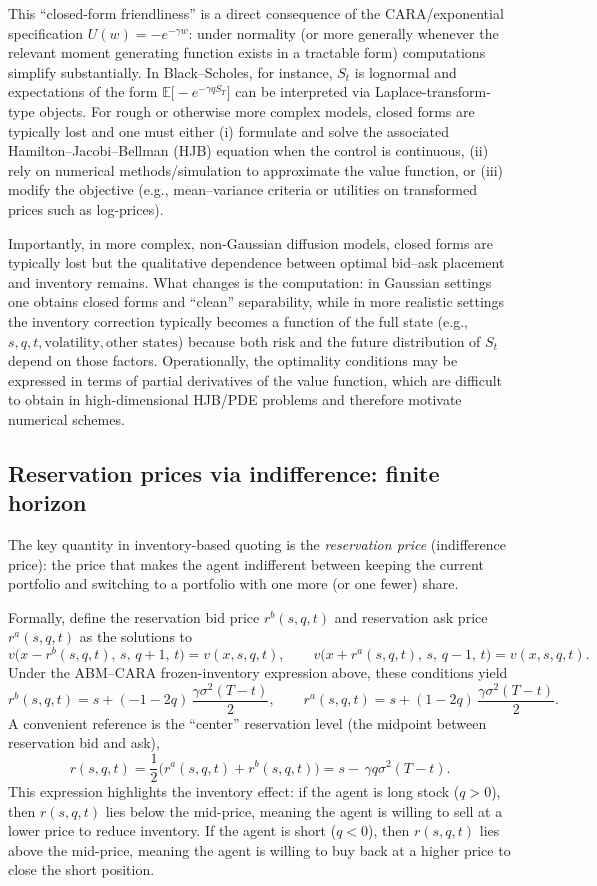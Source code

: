 This ``closed-form friendliness'' is a direct consequence of the CARA/exponential specification $U(w)=-e^{-\gamma w}$: under normality (or more generally whenever the relevant moment generating function exists in a tractable form) computations simplify substantially. In Black--Scholes, for instance, $S_t$ is lognormal and expectations of the form $\mathbb{E}\bigl[-e^{-\gamma q S_T}\bigr]$ can be interpreted via Laplace-transform-type objects. For rough or otherwise more complex models, closed forms are typically lost and one must either (i) formulate and solve the associated Hamilton--Jacobi--Bellman (HJB) equation when the control is continuous, (ii) rely on numerical methods/simulation to approximate the value function, or (iii) modify the objective (e.g., mean--variance criteria or utilities on transformed prices such as log-prices).

Importantly, in more complex, non-Gaussian diffusion models, closed forms are typically lost but the qualitative dependence between optimal bid--ask placement and inventory remains. What changes is the computation: in Gaussian settings one obtains closed forms and ``clean'' separability, while in more realistic settings the inventory correction typically becomes a function of the full state (e.g., $s,q,t,\text{volatility},\text{other states}$) because both risk and the future distribution of $S_t$ depend on those factors. Operationally, the optimality conditions may be expressed in terms of partial derivatives of the value function, which are difficult to obtain in high-dimensional HJB/PDE problems and therefore motivate numerical schemes.

\subsection{Reservation prices via indifference: finite horizon}
The key quantity in inventory-based quoting is the \emph{reservation price} (indifference price): the price that makes the agent indifferent between keeping the current portfolio and switching to a portfolio with one more (or one fewer) share.

Formally, define the reservation bid price $r^b(s,q,t)$ and reservation ask price $r^a(s,q,t)$ as the solutions to
\[
v\bigl(x-r^b(s,q,t),\,s,\,q+1,\,t\bigr)=v(x,s,q,t),
\qquad
v\bigl(x+r^a(s,q,t),\,s,\,q-1,\,t\bigr)=v(x,s,q,t).
\]
Under the ABM--CARA frozen-inventory expression above, these conditions yield
\[
r^b(s,q,t)
=
s+(-1-2q)\,\frac{\gamma\sigma^2(T-t)}{2},
\qquad
r^a(s,q,t)
=
s+(1-2q)\,\frac{\gamma\sigma^2(T-t)}{2}.
\]
A convenient reference is the ``center'' reservation level (the midpoint between reservation bid and ask),
\[
r(s,q,t)
=
\frac12\bigl(r^a(s,q,t)+r^b(s,q,t)\bigr)
=
s-\,\gamma q\sigma^2(T-t).
\]
This expression highlights the inventory effect: if the agent is long stock ($q>0$), then $r(s,q,t)$ lies below the mid-price, meaning the agent is willing to sell at a lower price to reduce inventory. If the agent is short ($q<0$), then $r(s,q,t)$ lies above the mid-price, meaning the agent is willing to buy back at a higher price to close the short position.

